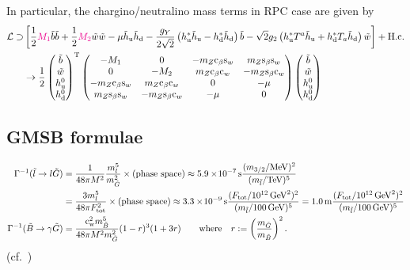 \documentclass[CheatSheet]{subfiles}
\begin{document}
In particular, the chargino/neutralino mass terms in RPC case are given by
\begin{align}
 \mathcal L\supset
&\left[
  \frac12{{\color{magenta}M_1}}\tilde b\tilde b
+ \frac12{{\color{magenta}M_2}}\tilde w\tilde w
- \mu\tilde h_{\mathrm{u}}\tilde h_{\mathrm{d}}
- \frac{g_Y}{2\sqrt2} \left(h_{\mathrm{u}}^*\tilde h_{\mathrm{u}}-h_{\mathrm{d}}^*\tilde h_{\mathrm{d}}\right)\tilde b
- \sqrt{2}{g_2} \left(h_{\mathrm{u}}^*T^a\tilde h_{\mathrm{u}}+h_{\mathrm{d}}^*T_a\tilde h_{\mathrm{d}}\right)\tilde w
\right]+\text{H.c.}
\\
&\to
\frac{1}{2}
\begin{pmatrix}\tilde b \\ \tilde w \\ h_{\mathrm{u}}^0 \\ h_{\mathrm{d}}^0\end{pmatrix}^{\mathrm{T}}
\begin{pmatrix}
 -M_1 & 0 & -m_Z \mathrm{c}_{\beta} \mathrm{s}_{w} & m_Z \mathrm{s}_{\beta} \mathrm{s}_{w} \\
 0 & -M_ 2 & m_Z \mathrm{c}_{\beta} \mathrm{c}_{w} & -m_Z \mathrm{s}_{\beta} \mathrm{c}_{w} \\
 -m_Z \mathrm{c}_{\beta} \mathrm{s}_{w} & m_Z \mathrm{c}_{\beta} \mathrm{c}_{w} & 0 & -\mu  \\
 m_Z \mathrm{s}_{\beta} \mathrm{s}_{w} & -m_Z \mathrm{s}_{\beta} \mathrm{c}_{w} & -\mu  & 0
\end{pmatrix}
\begin{pmatrix}\tilde b \\ \tilde w \\ h_{\mathrm{u}}^0 \\ h_{\mathrm{d}}^0\end{pmatrix}
\end{align}

\clearpage

\subsection{GMSB formulae}
\begin{align}
 \Gamma^{-1}(\tilde l\to l\tilde G)
&=
\frac{1}{48\pi M^2}\frac{m_l^5}{m_{\tilde G}^2}\times\text{(phase space)}
\approx5.9\EE-7\unit{s} \frac{(m_{3/2}/\text{MeV})^2}{(m_{\tilde l}/\text{TeV})^5}
\\&=
\frac{3m_l^5}{48\pi F\w{tot}^2}\times\text{(phase space)}
\approx3.3\EE-9\unit{s} \frac{(F\w{tot}/10^{12}\GeV^2)^2}{(m_{\tilde l}/100\GeV)^5}
=1.0\unit{m} \frac{(F\w{tot}/10^{12}\GeV^2)^2}{(m_{\tilde l}/100\GeV)^5}
\\
 \Gamma^{-1}(\tilde B\to \gamma\tilde G)
&=
\frac{\cw^2 m_{\tilde B}^5}{48\pi M^2m_{\tilde G}^2}(1-r)^3(1+3r)
\qquad\text{where}\quad r:=\left(\frac{m_{\tilde G}}{m_{\tilde B}}\right)^2.
\end{align}
(cf.~\cite{0908.3399})
\end{document}
